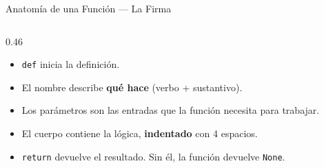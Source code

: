 \documentclass[aspectratio=169, 11pt]{beamer}
\begin{document}
\begin{frame}[fragile,shrink=28]{Anatomía de una Función --- La Firma}
\begin{columns}[T]
    \begin{column}{0.46\textwidth}
      \vspace{2pt}
      {\scriptsize\color{textMuted}
      \begin{itemize}\setlength{\itemsep}{4pt}
        \item[{\color{arcaRed}\scriptsize\faArrowRight}]
          \texttt{def} inicia la definición.
        \item[{\color{arcaRed}\scriptsize\faArrowRight}]
          El nombre describe \textbf{qué hace}
          (verbo + sustantivo).
        \item[{\color{arcaRed}\scriptsize\faArrowRight}]
          Los parámetros son las entradas que
          la función necesita para trabajar.
        \item[{\color{arcaRed}\scriptsize\faArrowRight}]
          El cuerpo contiene la lógica,
          \textbf{indentado} con 4 espacios.
        \item[{\color{arcaRed}\scriptsize\faArrowRight}]
          \texttt{return} devuelve el resultado.
          Sin él, la función devuelve \texttt{None}.
      \end{itemize}
      }
    \end{column}
  \end{columns}
\end{frame}
\end{document}
